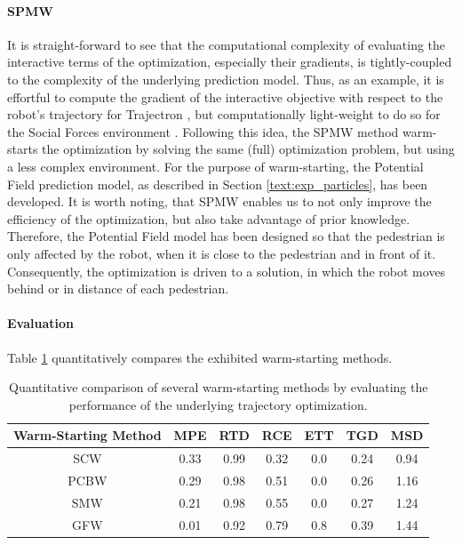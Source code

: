 \paragraph{\ac{SPMW}}
It is straight-forward to see that the computational complexity of evaluating the interactive terms of the optimization, especially their gradients, is tightly-coupled  to the complexity of the underlying prediction model. 
Thus, as an example, it is effortful to compute the gradient of the interactive objective with respect to the robot's trajectory for Trajectron \cite{Ivanovic2018}, but computationally light-weight to do so for the Social Forces environment \cite{Helbing1995}. Following this idea, the \ac{SPMW} method warm-starts the optimization by solving the same (full) optimization problem, but using a less complex environment. For the purpose of warm-starting, the Potential Field prediction model, as described in Section \ref{text:exp_particles}, has been developed. It is worth noting, that \ac{SPMW} enables us to not only improve the efficiency of the optimization, but also take advantage of prior knowledge. Therefore, the Potential Field model has been designed so that the pedestrian is only affected by the robot, when it is close to the pedestrian and in front of it. Consequently, the optimization is driven to a solution, in which the robot moves behind or in distance of each pedestrian.

\paragraph{Evaluation}
Table \ref{table:warm_start} quantitatively compares the exhibited warm-starting methods. 

\begin{table}[!ht]
\begin{center}
\begin{tabular}{c|c|c|c|c|c|c}
\bf Warm-Starting Method & \bf MPE & \bf RTD & \bf RCE & \bf ETT & \bf TGD & \bf MSD \\
\hline
SCW & 0.33 & 0.99 & 0.32 & 0.0 & 0.24 & 0.94 \\
\hline
PCBW & 0.29 & 0.98 & 0.51 & 0.0 & 0.26 & 1.16 \\
\hline
SMW & 0.21 & 0.98 & 0.55 & 0.0 & 0.27 & 1.24 \\ 
\hline
\rowcolor{our_color}
GFW & 0.01 & 0.92 & 0.79 & 0.8 & 0.39 & 1.44 
\end{tabular}
\end{center}
\caption{Quantitative comparison of several warm-starting methods by evaluating the performance of the underlying trajectory optimization.}
\label{table:warm_start}
\end{table}

